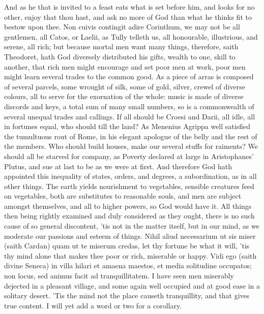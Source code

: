{And as he that is invited to a feast eats what is set before him,
and looks for no other, enjoy that thou hast, and ask no more of God
than what he thinks fit to bestow upon thee. Non cuivis contingit adire
Corinthum, we may not be all gentlemen, all Catos, or Laelii, as Tully
telleth us, all honourable, illustrious, and serene, all rich; but
because mortal men want many things, therefore, saith Theodoret,
hath God diversely distributed his gifts, wealth to one, skill to
another, that rich men might encourage and set poor men at work, poor
men might learn several trades to the common good. As a piece of arras
is composed of several parcels, some wrought of silk, some of gold,
silver, crewel of diverse colours, all to serve for the exornation of
the whole: music is made of diverse discords and keys, a total sum of
many small numbers, so is a commonwealth of several unequal trades and
callings. If all should be Croesi and Darii, all idle, all in
fortunes equal, who should till the land? As Menenius Agrippa
well satisfied the tumultuous rout of Rome, in his elegant apologue of
the belly and the rest of the members. Who should build houses, make
our several stuffs for raiments? We should all be starved for company,
as Poverty declared at large in Aristophanes' Plutus, and sue at last
to be as we were at first. And therefore God hath appointed this
inequality of states, orders, and degrees, a subordination, as in all
other things. The earth yields nourishment to vegetables, sensible
creatures feed on vegetables, both are substitutes to reasonable souls,
and men are subject amongst themselves, and all to higher powers, so
God would have it. All things then being rightly examined and duly
considered as they ought, there is no such cause of so general
discontent, 'tis not in the matter itself, but in our mind, as we
moderate our passions and esteem of things. Nihil aliud necessarium ut
sis miser (saith Cardan) quam ut te miserum credas, let thy
fortune be what it will, 'tis thy mind alone that makes thee poor or
rich, miserable or happy. Vidi ego (saith divine Seneca) in villa
hilari et amaena maestos, et media solitudine occupatos; non locus, sed
animus facit ad tranquillitatem. I have seen men miserably dejected in
a pleasant village, and some again well occupied and at good ease in a
solitary desert. 'Tis the mind not the place causeth tranquillity, and
that gives true content. I will yet add a word or two for a corollary.

}
